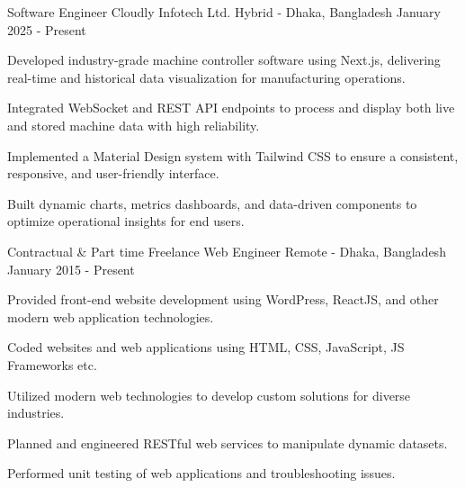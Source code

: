

\begin{cventries}

    \cventry
        {Software Engineer}
        {Cloudly Infotech Ltd.}
        {Hybrid - Dhaka, Bangladesh}
        {January 2025 - Present}
        {
            \begin{cvitems}
                \item {Developed industry-grade machine controller software using Next.js, delivering real-time and historical data visualization for manufacturing operations.}
                \item {Integrated WebSocket and REST API endpoints to process and display both live and stored machine data with high reliability.}
                \item {Implemented a Material Design system with Tailwind CSS to ensure a consistent, responsive, and user-friendly interface.}
                \item {Built dynamic charts, metrics dashboards, and data-driven components to optimize operational insights for end users.}
            \end{cvitems}
        }

    \cventry
        {Contractual \& Part time}
        {Freelance Web Engineer}
        {Remote - Dhaka, Bangladesh}
        {January 2015 - Present}
        {
            \begin{cvitems}
                \item {Provided front-end website development using WordPress, ReactJS, and other modern web application technologies.}
                \item {Coded websites and web applications using HTML, CSS, JavaScript, JS Frameworks etc.}
                \item {Utilized modern web technologies to develop custom solutions for diverse industries.}
                \item {Planned and engineered RESTful web services to manipulate dynamic datasets.}
                \item {Performed unit testing of web applications and troubleshooting issues.}
            \end{cvitems}
        }


\end{cventries}
